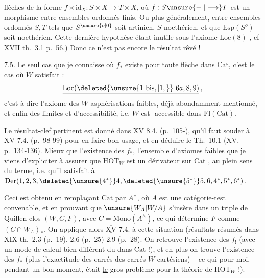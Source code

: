 flèches de la forme $f\times\mathrm{id}_X:S\times X\longrightarrow T\times X$, où $f:S\unsure{\relbar|\longrightarrow}T$ est un morphisme entre ensembles ordonnés finis. Ou plus généralement, entre ensembles ordonnés $S,T$ tels que $S^{\unsure{o|0}}$ soit artinien,  $S$ noethérien, et que $\mathrm{Esp}(S^o)$ soit noethérien. Cette dernière hypothèse étant inutile sous l'axiome $\mathrm{Loc}(8)$ , cf $\underline{\overline{\mathrm{XVII}}}$ th.~3.1 p.~56.) Donc ce n'est pas encore le résultat rêvé !

7.5. Le seul cas que je connaisse où $f_*$ existe pour \uline{toute} flèche dans $\mathrm{Cat}$, c'est le cas où $W$ satisfait :
\[
\underline{\mathrm{Loc}(\deleted{\unsure{1\ \mathrm{bis},|1,}}\ 6a,8,9)}\,,
\]
c'est à dire  l'axiome des $W$-asphérisations faibles, déjà abondamment mentionné, et enfin  des limites et d'accessibilité, i.e. $W$ est -accessible dans $\underline{\mathrm{Fl}}(\mathrm{Cat})$.

Le résultat-clef pertinent est donné dans XV 8.4. (p.~105-), qu'il faut souder à XV 7.4. (p.~98-99) pour en faire
bon usage, et en déduire le  Th.~10.1 (XV, p.~134-136). Mieux que l'existence des $f_*$, l'ensemble d'axiomes  faibles que je viens d'expliciter  à assurer que $\mathrm{HOT}_W$ est un \uline{dérivateur} sur $\mathrm{Cat}$  , au plein sens du terme, i.e. qu'il satisfait à $\mathrm{Der}(1,2,3,\deleted{\unsure{4^*}}4,\deleted{\unsure{5^*}}5,6,4^*,5^*,6^*)$.

Ceci est obtenu en remplaçant  $\mathrm{Cat}$ par $A^{\wedge}$, où $A$ est une catégorie-test convenable,  et en prouvant que   $\unsure{W_A|W/A}$ s'insère dans un triple de Quillen clos $(W,C,F)$, avec $C=\mathrm{Mono}(A^{\wedge})$, ce qui détermine $F$ comme $(C\cap W_A)_*$. On applique alors $\underline{\overline{\mathrm{XV}}}$ 7.4. à cette situation (résultats résumés dans XIX th.~2.3 (p.~19), 2.6 (p.~25) 2.9 (p.~28).
On retrouve l'existence des $f_!$ (avec un mode de calcul bien différent du  dans $\mathrm{Cat}$ !), et en plus on trouve l'existence des $f_*$ (plus l'exactitude des carrés
des carrés $W$-cartésiens) -- ce qui pour moi, pendant un bon moment, était \uline{le} gros problème pour la théorie de $\mathrm{HOT}_W$ !).

